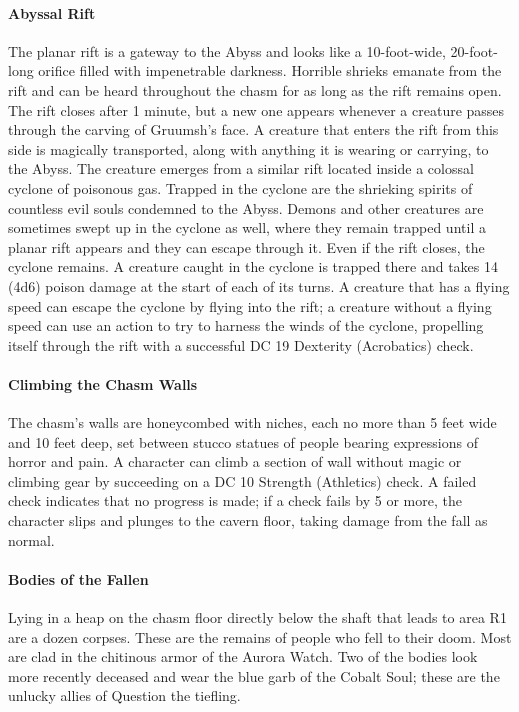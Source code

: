 \documentclass[10pt,a4,twoside,twocolumn,openany,nodeprecatedcode]{dndbook}
\begin{document}
\paragraph{Abyssal Rift}
The planar rift is a gateway to the Abyss and looks like a 10-foot-wide, 20-foot-long orifice filled with impenetrable darkness. Horrible shrieks emanate from the rift and can be heard throughout the chasm for as long as the rift remains open. The rift closes after 1 minute, but a new one appears whenever a creature passes through the carving of Gruumsh's face.
A creature that enters the rift from this side is magically transported, along with anything it is wearing or carrying, to the Abyss. The creature emerges from a similar rift located inside a colossal cyclone of poisonous gas. Trapped in the cyclone are the shrieking spirits of countless evil souls condemned to the Abyss. Demons and other creatures are sometimes swept up in the cyclone as well, where they remain trapped until a planar rift appears and they can escape through it. Even if the rift closes, the cyclone remains.
A creature caught in the cyclone is trapped there and takes 14 (4d6) poison damage at the start of each of its turns. A creature that has a flying speed can escape the cyclone by flying into the rift; a creature without a flying speed can use an action to try to harness the winds of the cyclone, propelling itself through the rift with a successful DC 19 Dexterity (Acrobatics) check.
\paragraph{Climbing the Chasm Walls}
The chasm's walls are honeycombed with niches, each no more than 5 feet wide and 10 feet deep, set between stucco statues of people bearing expressions of horror and pain. A character can climb a section of wall without magic or climbing gear by succeeding on a DC 10 Strength (Athletics) check. A failed check indicates that no progress is made; if a check fails by 5 or more, the character slips and plunges to the cavern floor, taking damage from the fall as normal.
\paragraph{Bodies of the Fallen}
Lying in a heap on the chasm floor directly below the shaft that leads to area R1 are a dozen corpses. These are the remains of people who fell to their doom. Most are clad in the chitinous armor of the Aurora Watch. Two of the bodies look more recently deceased and wear the blue garb of the Cobalt Soul; these are the unlucky allies of Question the tiefling.
\end{document}
